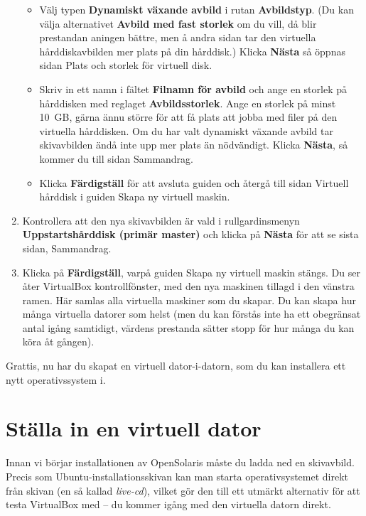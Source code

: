 \documentclass[a4paper,final]{memoir} %
\begin{document}
\begin{enumerate}
\begin{itemize}
\item Välj typen \textbf{Dynamiskt växande avbild} i rutan \textbf{Avbildstyp}. (Du kan välja alternativet \textbf{Avbild med fast storlek} om du vill, då blir prestandan aningen bättre, men å andra sidan tar den virtuella hårddiskavbilden mer plats på din hårddisk.) Klicka \textbf{Nästa} så öppnas sidan Plats och storlek för virtuell disk.

\item Skriv in ett namn i fältet \textbf{Filnamn för avbild} och ange en storlek på hårddisken med reglaget \textbf{Avbildsstorlek}. Ange en storlek på minst 10~GB, gärna ännu större för att få plats att jobba med filer på den virtuella hårddisken. Om du har valt dynamiskt växande avbild tar skivavbilden ändå inte upp mer plats än nödvändigt. Klicka \textbf{Nästa}, så kommer du till sidan Sammandrag. 

\item Klicka \textbf{Färdigställ} för att avsluta guiden och återgå till sidan Virtuell hårddisk i guiden Skapa ny virtuell maskin.

\end{itemize}

\item Kontrollera att den nya skivavbilden är vald i rullgardinsmenyn \textbf{Uppstartshårddisk (primär master)} och klicka på \textbf{Nästa} för att se sista sidan, Sammandrag.

\item Klicka på \textbf{Färdigställ}, varpå guiden Skapa ny virtuell maskin stängs. Du ser åter VirtualBox kontrollfönster, med den nya maskinen tillagd i den vänstra ramen. Här samlas alla virtuella maskiner som du skapar. Du kan skapa hur många virtuella datorer som helst (men du kan förstås inte ha ett obegränsat antal igång samtidigt, värdens prestanda sätter stopp för hur många du kan köra åt gången).

\end{enumerate}

Grattis, nu har du skapat en virtuell dator-i-datorn, som du kan installera ett nytt operativssystem i. 


\section{Ställa in en virtuell dator}

Innan vi börjar installationen av OpenSolaris måste du ladda ned en skivavbild. Precis som Ubuntu-installationsskivan kan man starta operativsystemet direkt från skivan (en så kallad \textit{live-cd}), vilket gör den till ett utmärkt alternativ för att testa VirtualBox med -- du kommer igång med den virtuella datorn direkt.
\end{document}
